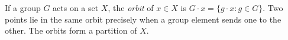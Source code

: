 
If a group $G$ acts on a set $X$, the \emph{orbit} of $x\in X$ is $G\cdot x=\{g\cdot x:g\in G\}$. Two points lie in the same orbit precisely when a group element sends one to the other. The orbits form a partition of $X$.

